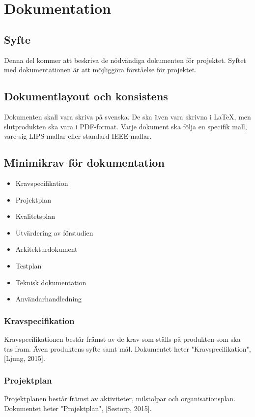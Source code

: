 \section{Dokumentation}

\subsection{Syfte}
Denna del kommer att beskriva de nödvändiga dokumenten för projektet. Syftet med dokumentationen är att möjliggöra förståelse för projektet.

\subsection{Dokumentlayout och konsistens}
Dokumenten skall vara skriva på svenska. De ska även vara skrivna i \LaTeX, men slutprodukten ska vara i PDF-format. Varje dokument ska följa en specifik mall, vare sig LIPS-mallar eller standard IEEE-mallar. 

\subsection{Minimikrav för dokumentation}
\begin{itemize}
\item Kravspecifikation
\item Projektplan
\item Kvalitetsplan
\item Utvärdering av förstudien
\item Arkitekturdokument
\item Testplan
\item Teknisk dokumentation
\item Användarhandledning
\end{itemize}

\subsubsection{Kravspecifikation}
Kravspecifikationen består främst av de krav som ställs på produkten som ska tas fram. Även produktens syfte samt mål. Dokumentet heter "Kravspecifikation", [Ljung, 2015].

\subsubsection{Projektplan}
Projektplanen består främst av aktiviteter, milstolpar och organisationsplan. Dokumentet heter "Projektplan", [Sestorp, 2015].

